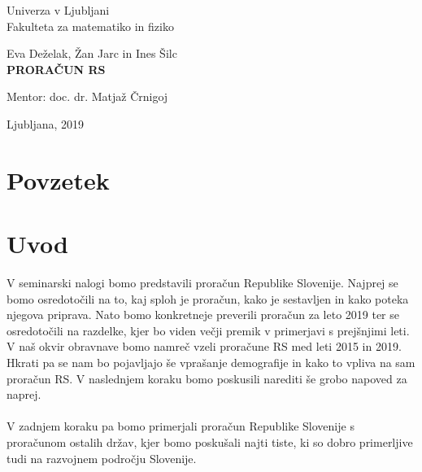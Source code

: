 \documentclass[12pt, a4paper]{article}
\begin{document}
\begin{titlepage}
\begin{center}

\large
Univerza v Ljubljani\\
\normalsize
Fakulteta za matematiko in fiziko\\

\vspace{3 cm} 

\large
Eva Deželak, Žan Jarc in Ines Šilc\\

\vspace{0.5cm}
\LARGE
\textbf{PRORAČUN RS}

\vspace{0.5 cm}
\normalsize


\vspace{1.5cm}
\normalsize
Mentor: doc. dr. Matjaž Črnigoj

\vspace{3cm}


\vfill

\large Ljubljana, 2019

\end{center}
\end{titlepage}



\newpage
\section*{Povzetek}


\newpage

\tableofcontents
\vspace{20mm}

\newpage
\section[Uvod]{Uvod}
V seminarski nalogi bomo predstavili proračun Republike Slovenije. Najprej se bomo osredotočili na to, kaj sploh je proračun, kako je sestavljen in kako poteka njegova priprava. Nato bomo konkretneje preverili proračun za leto 2019 ter se osredotočili na razdelke, kjer bo viden večji premik v primerjavi s prejšnjimi leti. V naš okvir obravnave bomo namreč vzeli proračune RS med leti 2015 in 2019. Hkrati pa se nam bo pojavljajo še vprašanje demografije in kako to vpliva na sam proračun RS. V naslednjem koraku bomo poskusili narediti še grobo napoved za naprej. \\
\\
V zadnjem koraku pa  bomo primerjali proračun Republike Slovenije s proračunom ostalih držav, kjer bomo poskušali najti tiste, ki so dobro primerljive tudi na razvojnem področju Slovenije. 
\\
\\
\end{document}
